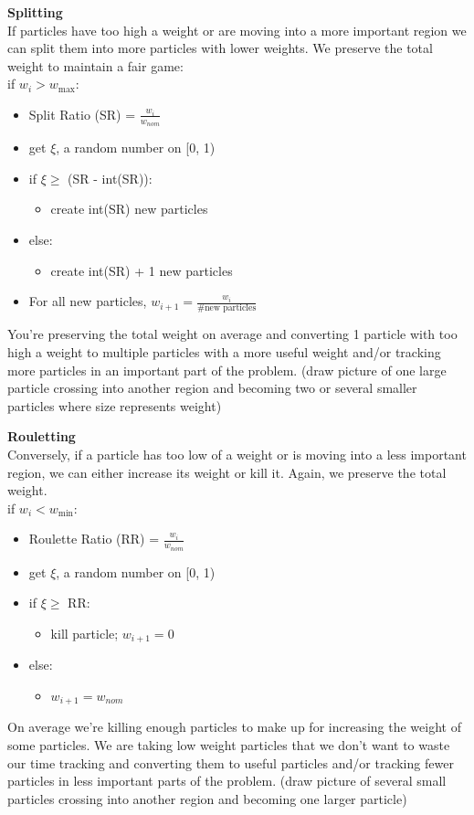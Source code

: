 \documentclass[12pt]{article}
\begin{document}
\textbf{Splitting}\\
If particles have too high a weight or are moving into a more important region we can split them into more particles with lower weights. We preserve the total weight to maintain a fair game:\\
\noindent\makebox[\linewidth]{\rule{\textwidth}{0.4pt}}
if $w_i > w_{\max}$:
\begin{itemize}
\item Split Ratio (SR) = $\frac{w_i}{w_{nom}}$
\item get $\xi$, a random number on [0, 1)
\item if $\xi \geq$ (SR - int(SR)):
  \begin{itemize}
  \item create int(SR) new particles
  \end{itemize}
\item else:
  \begin{itemize}
  \item create int(SR) + 1 new particles
  \end{itemize}
\item For all new particles, $w_{i+1} = \frac{w_i}{\# \text{new particles}}$
\end{itemize}
\noindent\makebox[\linewidth]{\rule{\textwidth}{0.4pt}}
%
You're preserving the total weight on average and converting 1 particle with too high a weight to multiple particles with a more useful weight and/or tracking more particles in an important part of the problem. (draw picture of one large particle crossing into another region and becoming two or several smaller particles where size represents weight)

\textbf{Rouletting}\\
Conversely, if a particle has too low of a weight or is moving into a less important region, we can either increase its weight or kill it. Again, we preserve the total weight.\\
\noindent\makebox[\linewidth]{\rule{\textwidth}{0.4pt}}
if $w_i < w_{\min}$:
\begin{itemize}
\item Roulette Ratio (RR) = $\frac{w_i}{w_{nom}}$
\item get $\xi$, a random number on [0, 1)
\item if $\xi \geq$ RR:
  \begin{itemize}
  \item kill particle; $w_{i+1} = 0$
  \end{itemize}
\item else:
  \begin{itemize}
  \item $w_{i+1} = w_{nom}$
  \end{itemize}
\end{itemize}
\noindent\makebox[\linewidth]{\rule{\textwidth}{0.4pt}}
%
On average we're killing enough particles to make up for increasing the weight of some particles. We are taking low weight particles that we don't want to waste our time tracking and converting them to useful particles and/or tracking fewer particles in less important parts of the problem. (draw picture of several small particles crossing into another region and becoming one larger particle)
\end{document}
